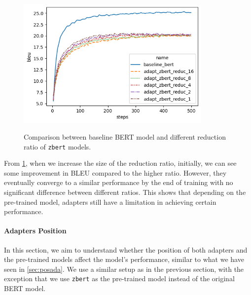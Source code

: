 \begin{figure}[]
    {\includegraphics[width=0.85\textwidth]{img/adapter_zbert_ratio.png}}
    \centering
    \caption{Comparison between baseline BERT model and different reduction ratio of \texttt{zbert} models.}
    \label{img:adapter_zbert_ratio}
\end{figure}

From \cref{img:adapter_zbert_ratio}, when we increase the size of the reduction ratio, initially, we can see some improvement in BLEU compared to the higher ratio. However, they eventually converge to a similar performance by the end of training with no significant difference between different ratios. This shows that depending on the pre-trained model, adapters still have a limitation in achieving certain performance.

\paragraph{Adapters Position}
In this section, we aim to understand whether the position of both adapters and the pre-trained models affect the model's performance, similar to what we have seen in \cref{sec:posada}. We use a similar setup as in the previous section, with the exception that we use \texttt{zbert} as the pre-trained model instead of the original BERT model.

